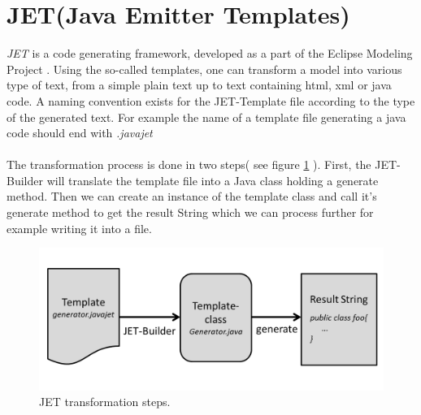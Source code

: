 \newpage

\section{JET(Java Emitter Templates)}
\textit{JET}\cite{JETWEB} is a code generating framework, developed as a part of the Eclipse Modeling Project \cite{EMPWEB}. Using the so-called templates, one can transform a model into various type of text, from a simple plain text up to text containing html, xml or java code. A naming convention exists for the JET-Template file according to the type of the generated text. For example the name of a template file generating a java code should end with \textit{.javajet}\\\\
The transformation process is done in two steps( see figure \ref{fig:jet_process} ). First, the JET-Builder will translate the template file into a Java class holding a generate method. Then we can create an instance of the template class and call it's generate method to get the result String which we can process further for example writing it into a file. 
\begin{figure}[h]
  \label{fig:jet_process}
	\centering
		\includegraphics[width=1.0\textwidth]{images/jet_process.png}
	\caption{JET transformation steps.}
\end{figure}\\

